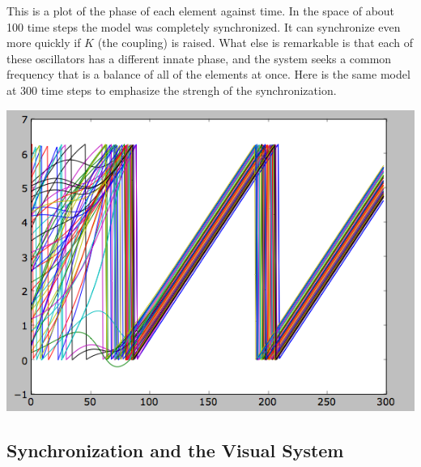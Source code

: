\documentclass[12pt]{article}
\begin{document}
This is a plot of the phase of each element against time.  In the space of about 100 time steps the model was completely synchronized.  It can synchronize even more quickly if $K$ (the coupling) is raised.  What else is remarkable is that each of these oscillators has a different innate phase, and the system seeks a common frequency that is a balance of all of the elements at once.  Here is the same model at 300 time steps to emphasize the strengh of the synchronization.

\includegraphics[scale=0.67]{synchronization.png}

\subsection{Synchronization and the Visual System}
\end{document}
